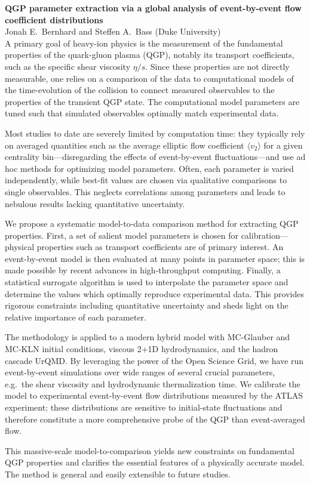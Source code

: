 \documentclass[letterpaper,102pt]{article}
\begin{document}
\noindent \textbf{QGP parameter extraction via a global analysis of event-by-event flow coefficient distributions} \\
Jonah E.\ Bernhard  and Steffen A.\ Bass (Duke University) \\[1ex]


\noindent A primary goal of heavy-ion physics is the measurement of the fundamental properties of the quark-gluon plasma (QGP), notably its
transport coefficients, such as the specific shear viscosity $\eta/s$.  Since these properties are not directly measurable, one relies on a
comparison of the data to computational models of the time-evolution of the collision to connect measured observables to the properties of
the transient QGP state.  The computational model parameters are tuned such that simulated observables optimally match experimental data.

Most studies to date are severely limited by computation time:  they typically rely on averaged quantities such as the average elliptic flow
coefficient $\langle v_2 \rangle$ for a given centrality bin---disregarding the effects of event-by-event fluctuations---and use ad hoc
methods for optimizing model parameters.  Often, each parameter is varied independently, while best-fit values are chosen via qualitative
comparisons to single observables.  This neglects correlations among parameters and leads to nebulous results lacking quantitative
uncertainty.

We propose a systematic model-to-data comparison method for extracting QGP properties.  First, a set of salient model parameters is chosen
for calibration---physical properties such as transport coefficients are of primary interest.  An event-by-event model is then evaluated at
many points in parameter space; this is made possible by recent advances in high-throughput computing.  Finally, a statistical surrogate
algorithm is used to interpolate the parameter space and determine the values which optimally reproduce experimental data.  This provides
rigorous constraints including quantitative uncertainty and sheds light on the relative importance of each parameter.  

The methodology is applied to a modern hybrid model with MC-Glauber and MC-KLN initial conditions, viscous 2+1D hydrodynamics, and the
hadron cascade UrQMD.  By leveraging the power of the Open Science Grid, we have run event-by-event simulations over wide ranges of several
crucial parameters, e.g.\ the shear viscosity and hydrodynamic thermalization time.  We calibrate the model to experimental event-by-event
flow distributions measured by the ATLAS experiment; these distributions are sensitive to initial-state fluctuations and therefore
constitute a more comprehensive probe of the QGP than event-averaged flow.

This massive-scale model-to-comparison yields new constraints on fundamental QGP properties and clarifies the essential features of a
physically accurate model.  The method is general and easily extensible to future studies.
\end{document}
